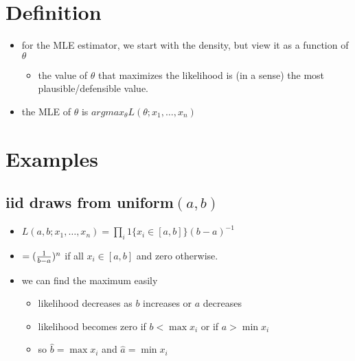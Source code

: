 \section{Definition}

\begin{itemize}
\item for the MLE estimator, we start with the density, but view it as a
     function of $\theta$
\begin{itemize}
\item the value of $\theta$ that maximizes the likelihood is (in a sense) the most plausible/defensible value.
\end{itemize}
\item the MLE of $\theta$ is $argmax_\theta L(\theta; x_1,\dots,x_n)$
\end{itemize}

\section{Examples}

\subsection{iid draws from uniform$(a,b)$}
\begin{itemize}
\item $L(a,b; x_1,\dots,x_n) = \prod_i 1\{x_i \in [a,b]\} (b-a)^{-1}$
\item $= ({1 \over b-a})^{n}$ if all $x_i \in [a,b]$ and zero otherwise.
\item we can find the maximum easily
\begin{itemize}
\item likelihood decreases as $b$ increases or $a$ decreases
\item likelihood becomes zero if $b < \max x_i$ or if $a > \min x_i$
\item so $\hat b = \max x_i$ and $\hat a = \min x_i$
\end{itemize}
\end{itemize}

